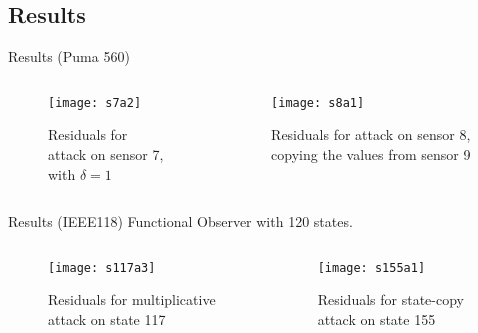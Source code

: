 
\subsection{Results}%
\label{subsec:fo-results}

\begin{slide}{Results (Puma 560)}
  \begin{columns}[c]
    \begin{column}{0.55\textwidth}
      \begin{figure}[ht!]
        \centering
        \texttt{[image: s7a2]}
        \caption{Residuals for attack on sensor 7, with \(\delta=1\)}%
        \label{fig:s7a2}
      \end{figure}
    \end{column}%
    \hfill%
    \begin{column}{0.55\textwidth}
      \begin{figure}[ht!]
        \centering
        \texttt{[image: s8a1]}
        \caption{Residuals for attack on sensor 8, copying the values from
          sensor 9}%
        \label{fig:s8a1}
      \end{figure}
    \end{column}%
  \end{columns}
\end{slide}

\begin{slide}{Results (IEEE118)}
  Functional Observer with 120 states.
  \begin{columns}[c]
    \begin{column}{0.55\textwidth}
      \begin{figure}[ht!]
        \centering
        \texttt{[image: s117a3]}
        \caption{Residuals for multiplicative attack on state 117}%
        \label{fig:s117a3}
      \end{figure}
    \end{column}%
    \hfill%
    \begin{column}{0.55\textwidth}
      \begin{figure}[ht!]
        \centering
        \texttt{[image: s155a1]}
        \caption{Residuals for state-copy attack on state 155}%
        \label{fig:s155a1}
      \end{figure}
    \end{column}%
  \end{columns}
\end{slide}
